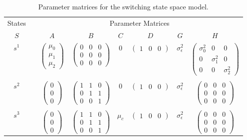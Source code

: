 \documentclass[12pt]{article}
\begin{document}
\begin{table}
\caption{Parameter matrices for the switching state space model.\label{tab:parmats}}
\centering
\begin{tabular}[h!]{@{}ccccccccc@{}}
\toprule
  \multicolumn{2}{c}{States} &\phantom{a}& \multicolumn{6}{c}{Parameter Matrices}\\
  \cmidrule{1-2} \cmidrule{4-9}
  \multicolumn{2}{c}{$S$}&& $A$ & $B$ & $C$ & $D$ & $G$ & $H$ \\
  \midrule
  \multicolumn{2}{c}{$s^1$} && $\begin{pmatrix} \mu_0 \\ \mu_1 \\ \mu_2 \end{pmatrix}$ & $\begin{pmatrix} 0&0&0 \\ 0&0&0 \\ 0&0&0 \end{pmatrix}$ & 0 & $\begin{pmatrix} 1&0&0 \end{pmatrix}$ & $\sigma_\epsilon^2$ & $\begin{pmatrix} \sigma_0^2&0&0 \\ 0&\sigma_1^2&0 \\ 0&0&\sigma_2^2 \end{pmatrix}$\\
  \\
  \multicolumn{2}{c}{$s^2$} && $\begin{pmatrix} 0 \\ 0 \\ 0 \end{pmatrix}$ & $\begin{pmatrix} 1&1&0 \\ 0&1&1 \\ 0&0&1 \end{pmatrix}$ & 0 & $\begin{pmatrix} 1&0&0 \end{pmatrix}$ & $\sigma_\epsilon^2$ & $\begin{pmatrix} 0&0&0 \\ 0&0&0 \\ 0&0&0 \end{pmatrix}$\\
  \\
  \multicolumn{2}{c}{$s^3$} && $\begin{pmatrix} 0 \\ 0 \\ 0 \end{pmatrix}$ & $\begin{pmatrix} 1&1&0 \\ 0&1&1 \\ 0&0&1 \end{pmatrix}$ & $\mu_c$ & $\begin{pmatrix} 1&0&0 \end{pmatrix}$ & $\sigma_\epsilon^2$ & $\begin{pmatrix} 0&0&0 \\ 0&0&0 \\ 0&0&0 \end{pmatrix}$\\

\end{tabular}
\end{table}
\end{document}
